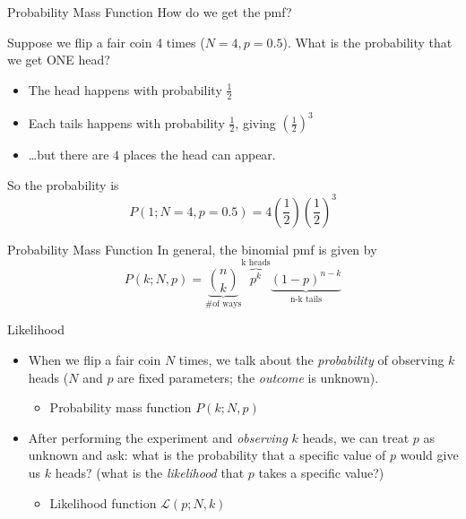 \documentclass{beamer}
\begin{document}
\begin{frame}{Probability Mass Function}
How do we get the pmf? \par Suppose we flip a fair coin 4 times ($N=4, p = 0.5$). What is the probability that we get ONE head?
        \begin{itemize}
                \item The head happens with probability $\frac{1}{2}$
                \item Each tails happens with probability $\frac{1}{2}$, giving
                         $\left ( \frac{1}{2} \right )^3$
                \item \dots but there are $4$ places the head can appear.
        \end{itemize}
So the probability is 
        \[
                P(1;N=4,p=0.5) = 
                        4 \left ( \frac{1}{2} \right ) \left ( \frac{1}{2} \right )^3
        \]
\end{frame}

\begin{frame}{Probability Mass Function}
In general, the binomial pmf is given by
                \[
                P(k;N,p) = \underbrace{{n \choose k}}_{\text{\# of ways}}
                                \overbrace{p^k}^{\text{k heads}}
                                \underbrace{(1-p)^{n-k}}_{\text{n-k tails}}
                \]
\end{frame}

\begin{frame}{Likelihood}
        \begin{itemize}
                \item When we flip a fair coin $N$ times, we talk about the \emph{probability} of observing $k$ heads ($N$ and $p$ are fixed parameters; the \emph{outcome} is unknown).
                        \begin{itemize}
                                \item Probability mass function $P(k;N,p)$
                        \end{itemize}
                \item After performing the experiment and \emph{observing} $k$ heads, we can treat $p$ as unknown and ask: what is the probability that a specific value of $p$ would give us $k$ heads? (what is the \emph{likelihood} that $p$ takes a specific value?)
                        \begin{itemize}
                                \item Likelihood function $\mathcal{L}(p;N,k)$
                        \end{itemize}
        \end{itemize}
\end{frame}
\end{document}
